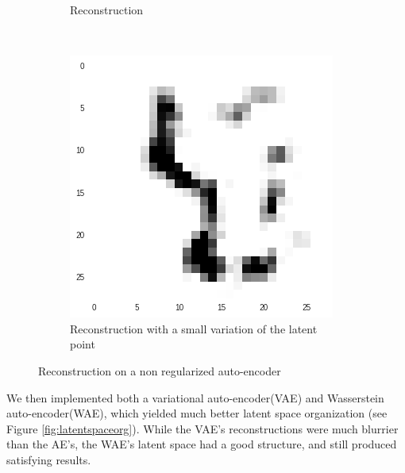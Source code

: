 \documentclass[11pt, english]{article}
\begin{document}
\begin{figure}[h!]
{\begin{subfigure}[t]{.32\linewidth}
    \caption{Reconstruction}
    \end{subfigure}
    ~
    \begin{subfigure}[t]{.32\linewidth}
    \centering \includegraphics[width=\linewidth]{img/alien.png}
    \caption{Reconstruction with a small variation of the latent point}
    \end{subfigure}
    }
    \caption{Reconstruction on a non regularized auto-encoder}
\end{figure}

We then implemented both a variational auto-encoder(VAE) and Wasserstein auto-encoder(WAE), which yielded much better latent space organization (see Figure \ref{fig:latentspaceorg}). 
While the VAE's reconstructions were much blurrier than the AE's, the WAE's latent space had a good structure, and still produced satisfying results.
\end{document}
